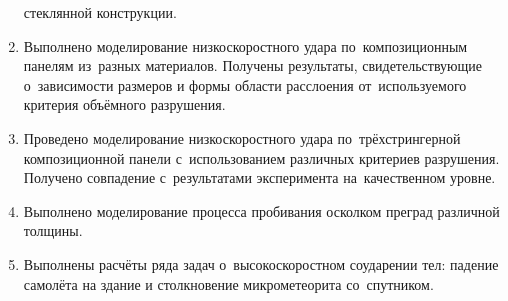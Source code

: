 \documentclass[thesis.tex]{subfiles}
\begin{document}
\begin{enumerate}
              стеклянной конструкции.
        \item Выполнено моделирование низкоскоростного удара по~композиционным панелям из~разных материалов. Получены
              результаты, свидетельствующие о~зависимости размеров и формы области расслоения от~используемого критерия
              объёмного разрушения.
        \item Проведено моделирование низкоскоростного удара по~трёхстрингерной композиционной панели с~использованием
              различных критериев разрушения. Получено совпадение с~результатами эксперимента на~качественном уровне.
        \item Выполнено моделирование процесса пробивания осколком преград различной толщины.
        \item Выполнены расчёты ряда задач о~высокоскоростном соударении тел: падение самолёта на
              здание и столкновение микрометеорита со~спутником.

    \end{enumerate}
\end{document}

